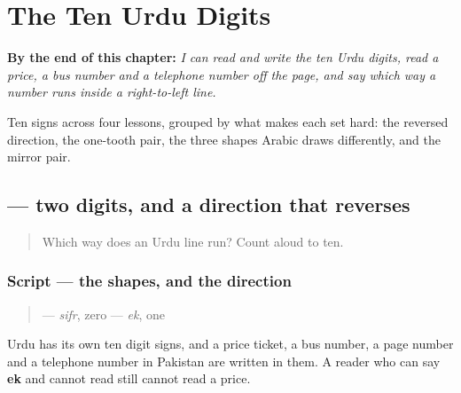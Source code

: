 
\chapter{The Ten Urdu Digits}
\label{ch:ur-digits}

\begin{chapteropening}
\textbf{By the end of this chapter:} \emph{I can read and write the ten Urdu digits, read a price, a bus number and a telephone number off the page, and say which way a number runs inside a right-to-left line.}

Ten signs across four lessons, grouped by what makes each set hard: the reversed direction, the one-tooth pair, the three shapes Arabic draws differently, and the mirror pair.
\end{chapteropening}

\section[\texorpdfstring{\ur{۰} \ur{۱} (sifr ek)}{۰ ۱ (sifr ek)}]{  — two digits, and a direction that reverses}

\label{lesson:UR-W31-digits-zero-one}



\begin{quote}
Which way does an Urdu line run? Count aloud to ten.
\end{quote}

\subsection*{Script — the shapes, and the direction}

\begin{quote}
\textbf{} — \emph{sifr}, zero  \textbf{} — \emph{ek}, one
\end{quote}

Urdu has its own ten digit signs, and a price ticket, a bus number, a page number and a telephone number in Pakistan are written in them. A reader who can say \textbf{ek} and cannot read \textbf{} still cannot read a price.

